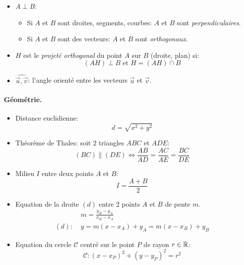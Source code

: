 \documentclass[12pt]{article}
\begin{document}
\begin{itemize}
    \item $A \perp B$: 
    \begin{itemize}
        \item Si $A$ et $B$ sont droites, segments, courbes:
            $A$ et $B$ sont \textit{perpendiculaires}.
        \item Si $A$ et $B$ sont des vecteurs:
            $A$ et $B$ sont \textit{orthogonaux}.
    \end{itemize}
    
    \item $H$ est le \textit{projeté orthogonal} du point $A$
        sur $B$ (droite, plan) si: $$
            (AH) \perp B \text{ et } H = (AH) \cap B
        $$
    \item $\widehat{\vec{u}, \vec{v}}$: l'angle orienté entre les vecteurs
        $\vec{u}$ et $\vec{v}$.
\end{itemize}

\paragraph{Géométrie.}
\begin{itemize}
    \item Distance euclidienne: $$
        d = \sqrt{x^2 + y^2}
    $$
    \item Théorème de Thales: soit $2$ triangles $ABC$ et $ADE$: $$
        (BC) \parallel (DE) \iff
        \frac{AB}{AD} = \frac{AC}{AE} = \frac{BC}{DE}
    $$

    \item Milieu $I$ entre deux points $A$ et $B$: $$
        I = \frac{A + B}{2}
    $$

    \item Equation de la droite $(d)$ entre $2$ points $A$ et $B$ de pente $m$. $$
    \begin{aligned}
              &m = \frac{y_B - y_A}{x_B - x_A} \\
        (d):\;&y = m(x - x_A) + y_A = m(x - x_B) + y_B 
    \end{aligned}
    $$
    \item Equation du cercle $\mathcal{C}$ centré sur 
        le point $P$ de rayon $r \in \mathbb{R}$: $$
        \mathcal{C}: (x - x_P)^2 + (y - y_P)^2 = r^2
    $$
\end{itemize}
\end{document}
